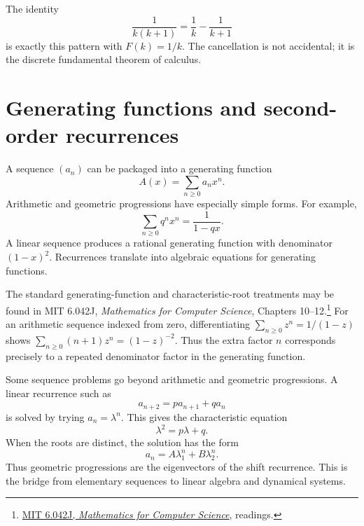 The identity
\[
  \frac{1}{k(k+1)}=\frac1k-\frac{1}{k+1}
\]
is exactly this pattern with \(F(k)=1/k\).  The cancellation is not accidental; it is the discrete fundamental theorem of calculus.

\section{Generating functions and second-order recurrences}

A sequence \((a_n)\) can be packaged into a generating function
\[
  A(x)=\sum_{n\ge0}a_nx^n.
\]
Arithmetic and geometric progressions have especially simple forms.  For example,
\[
  \sum_{n\ge0}q^nx^n=\frac{1}{1-qx}.
\]
A linear sequence produces a rational generating function with denominator \((1-x)^2\).  Recurrences translate into algebraic equations for generating functions.

The standard generating-function and characteristic-root treatments may be found in MIT 6.042J, \emph{Mathematics for Computer Science}, Chapters 10--12.\footnote{\href{https://ocw.mit.edu/courses/6-042j-mathematics-for-computer-science-fall-2010/pages/readings/}{MIT 6.042J, \emph{Mathematics for Computer Science}}, readings.} For an arithmetic sequence indexed from zero, differentiating \(\sum_{n\ge0}z^n=1/(1-z)\) shows \(\sum_{n\ge0}(n+1)z^n=(1-z)^{-2}\). Thus the extra factor \(n\) corresponds precisely to a repeated denominator factor in the generating function.

Some sequence problems go beyond arithmetic and geometric progressions.  A linear recurrence such as
\[
  a_{n+2}=pa_{n+1}+qa_n
\]
is solved by trying \(a_n=\lambda^n\).  This gives the characteristic equation
\[
  \lambda^2=p\lambda+q.
\]
When the roots are distinct, the solution has the form
\[
  a_n=A\lambda_1^n+B\lambda_2^n.
\]
Thus geometric progressions are the eigenvectors of the shift recurrence.  This is the bridge from elementary sequences to linear algebra and dynamical systems.
